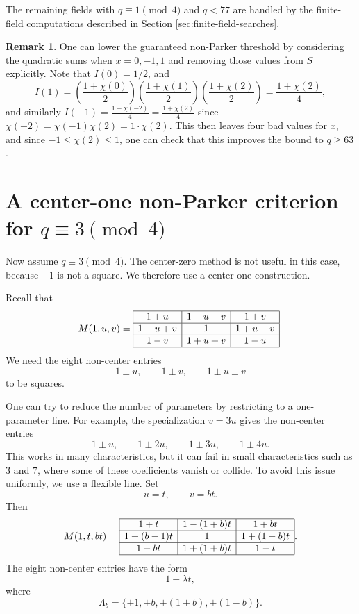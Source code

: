 \documentclass{article}
\newcommand{\p}[1]{\left( #1 \right)}
\theoremstyle{definition}
\newtheorem{remark}[theorem]{Remark}
\numberwithin{equation}{section}
\begin{document}
The remaining fields with \(q\equiv1\pmod4\) and \(q<77\) are handled by the
finite-field computations described in Section \ref{sec:finite-field-searches}.

\begin{remark}
One can lower the guaranteed non-Parker threshold by considering the quadratic sums when $x=0, -1, 1$ and removing those values from $S$ explicitly. Note that $I(0)=1/2$, and
$$I(1) = \p{\frac{1+\chi(0)}{2}}\p{\frac{1+\chi(1)}{2}}\p{\frac{1+\chi(2)}{2}} = \frac{1+\chi(2)}{4},$$ and similarly $I(-1) = \frac{1+\chi(-2)}{4}=\frac{1+\chi(2)}{4}$ since $\chi(-2)=\chi(-1)\chi(2) = 1\cdot \chi(2)$. This then leaves four bad values for \(x\), and since \(-1\leq\chi(2)\leq1\), one can check that this improves the bound to \(q\geq63\).
\end{remark}

\section{A center-one non-Parker criterion for \(q\equiv3\pmod4\)}
\label{sec:center-one-square}

Now assume \(q\equiv3\pmod4\).  The center-zero method is not useful in this
case, because \(-1\) is not a square.  We therefore use a center-one
construction.

Recall that
\[
M(1,u,v)=
\begin{array}{|c|c|c|}
\hline
1+u & 1-u-v & 1+v\\
\hline
1-u+v & 1 & 1+u-v\\
\hline
1-v & 1+u+v & 1-u \\
\hline
\end{array}.
\]
We need the eight non-center entries
\[
1\pm u,
\qquad 1\pm v,
\qquad 1\pm u\pm v
\]
to be squares.

One can try to reduce the number of parameters by restricting to a one-parameter line. For example, the specialization \(v=3u\) gives the non-center entries
\[
1\pm u,\qquad 1\pm 2u,\qquad 1\pm 3u,\qquad 1\pm 4u.
\]
This works in many characteristics, but it can fail in small characteristics such as \(3\) and \(7\), where some of these coefficients vanish or collide. To avoid this issue uniformly, we use a flexible line.
Set
\[
u=t,
\qquad
v=bt.
\]
Then
\[
M(1,t,bt)=
\begin{array}{|c|c|c|}
\hline
1+t & 1-(1+b)t & 1+bt\\
\hline
1+(b-1)t & 1 & 1+(1-b)t\\
\hline
1-bt & 1+(1+b)t & 1-t \\
\hline
\end{array}.
\]
The eight non-center entries have the form
\[
1+\lambda t,
\]
where
\[
\Lambda_b=\{\pm1,\pm b,\pm(1+b),\pm(1-b)\}.
\]
\end{document}
